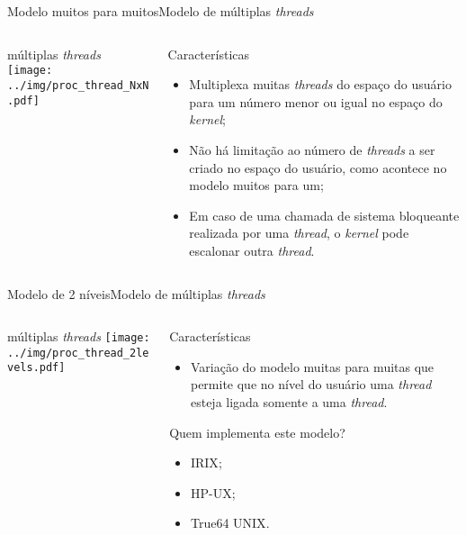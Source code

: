\begin{frame}{Modelo muitos para muitos}{Modelo de múltiplas {\em threads}}
  \begin{columns}
    \begin{column}{0.4\textwidth}
      \begin{block}{múltiplas \em threads}
        \texttt{[image: ../img/proc\_thread\_NxN.pdf]}
      \end{block}
    \end{column}
    \begin{column}{0.6\textwidth}
      \begin{block}{Características}
        \begin{itemize}
        \item Multiplexa muitas {\em threads} do espaço do usuário
          para um número menor ou igual no espaço do {\em kernel};
        \item Não há limitação ao número de {\em threads} a ser criado
          no espaço do usuário, como acontece no modelo muitos para um;
        \item Em caso de uma chamada de sistema bloqueante realizada por 
           uma {\em thread}, o {\em kernel} pode escalonar outra {\em thread}.
        \end{itemize}
      \end{block}
      
    \end{column}
  \end{columns}
\end{frame}

\begin{frame}{Modelo de 2 níveis}{Modelo de múltiplas {\em threads}}
  \begin{columns}
    \begin{column}{0.45\textwidth}
      \begin{block}{múltiplas \em threads}
        \texttt{[image: ../img/proc\_thread\_2levels.pdf]}
      \end{block}
    \end{column}
    \begin{column}{0.55\textwidth}
      \begin{block}{Características}
        \begin{itemize}
        \item Variação do modelo muitas para muitas que permite que no
          nível do usuário uma {\em thread} esteja ligada somente a
          uma {\em thread}.
        \end{itemize}
      \end{block}
        \begin{block}{Quem implementa este modelo?}
          \begin{itemize}
          \item {\sc IRIX};
          \item {\sc HP-UX};
          \item True64 {\sc UNIX}.
          \end{itemize}
        \end{block}
    \end{column}
  \end{columns}
\end{frame}
